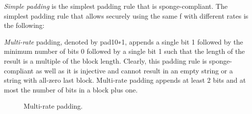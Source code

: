 \emph{Simple padding} is the simplest padding rule that is sponge-compliant. The simplest padding rule that allows securely using the same f with different rates is the following:
\begin{defn} \emph{Multi-rate} padding, denoted by pad10∗1, appends a single bit 1 followed by the minimum number of bits 0 followed by a single bit 1 such that the length of the result is a multiple of the block length.
Clearly, this padding rule is sponge-compliant as well as it is injective and cannot result in an empty string or a string with all-zero last block. Multi-rate padding appends at least 2 bits and at most the number of bits in a block plus one.
\end{defn}


\begin{figure}[H]
  \centering
  \caption{\label{fig:MultiPadding}Multi-rate padding.}
\end{figure}


